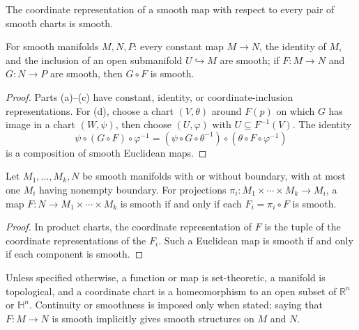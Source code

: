 \begin{lemma}
\label{exer:2-9}
\leanok
{}
The coordinate representation of a smooth map with respect to every pair of smooth charts is smooth.
\end{lemma}

\begin{proposition}
\label{prop:2-10}
\mathlibok
{}
For smooth manifolds $M,N,P$: every constant map $M\to N$, the identity of $M$, and the inclusion of an open submanifold $U\hookrightarrow M$ are smooth; if $F:M\to N$ and $G:N\to P$ are smooth, then $G\circ F$ is smooth.
\end{proposition}

\begin{proof}
\sketch Parts (a)--(c) have constant, identity, or coordinate-inclusion representations. For (d), choose a chart $(V,\theta)$ around $F(p)$ on which $G$ has image in a chart $(W,\psi)$, then choose $(U,\varphi)$ with $U\subseteq F^{-1}(V)$. The identity
\[
\psi\circ(G\circ F)\circ\varphi^{-1}=(\psi\circ G\circ\theta^{-1})\circ(\theta\circ F\circ\varphi^{-1})
\]
is a composition of smooth Euclidean maps.
\end{proof}


\begin{proposition}
\label{prop:2-12}
\leanok
{}
Let $M_1,\ldots,M_k,N$ be smooth manifolds with or without boundary, with at most one $M_i$ having nonempty boundary. For projections $\pi_i:M_1\times\cdots\times M_k\to M_i$, a map $F:N\to M_1\times\cdots\times M_k$ is smooth if and only if each $F_i=\pi_i\circ F$ is smooth.
\end{proposition}

\begin{proof}
\leanok
\sketch In product charts, the coordinate representation of $F$ is the tuple
of the coordinate representations of the $F_i$. Such a Euclidean map is smooth
if and only if each component is smooth.
\end{proof}

\begin{remark}
\label{rem:2-8-extra-7}
\mathlibok
Unless specified otherwise, a function or map is set-theoretic, a manifold is topological, and a coordinate chart is a homeomorphism to an open subset of $\mathbb R^n$ or $\mathbb H^n$. Continuity or smoothness is imposed only when stated; saying that $F:M\to N$ is smooth implicitly gives smooth structures on $M$ and $N$.
\end{remark}

